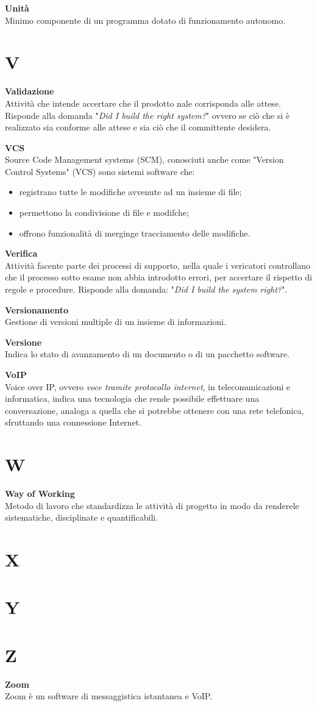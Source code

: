 \documentclass[a4paper, oneside, openany, dvipsnames, table, 12pt]{article}
\begin{document}
\textbf{Unità} \\
Minimo componente di un programma dotato di funzionamento autonomo.


\newpage
\section{V}
\textbf{Validazione} \\
Attività che intende accertare che il prodotto nale corrisponda alle attese. Risponde alla domanda "\textit{Did I build the right system?}" ovvero se ciò che si è realizzato sia conforme alle attese e sia ciò che il committente desidera.

\textbf{VCS} \\
Source Code Management systems (SCM), conosciuti anche come "Version Control Systems" (VCS) sono sistemi software che: \begin{itemize}
\item registrano tutte le modifiche avvenute ad un insieme di file;
\item permettono la condivisione di file e modifche;
\item offrono funzionalità di merging\glo e tracciamento delle modifiche.
\end{itemize}

\textbf{Verifica} \\
Attività facente parte dei processi di supporto, nella quale i vericatori controllano che il processo sotto esame non abbia introdotto errori, per accertare il rispetto di regole e procedure. Risponde alla domanda: "\textit{Did I build the system right?}".

\textbf{Versionamento} \\
Gestione di versioni multiple di un insieme di informazioni.

\textbf{Versione} \\
Indica lo stato di avanzamento di un documento o di un pacchetto software.

\textbf{VoIP} \\
Voice over IP, ovvero \textit{voce tramite protocollo internet}, in telecomunicazioni e informatica, indica una tecnologia che rende possibile effettuare una conversazione, analoga a quella che si potrebbe ottenere con una rete telefonica, sfruttando una connessione Internet.

\newpage
\section{W}
\textbf{Way of Working} \\
Metodo di lavoro che standardizza le attività di progetto in modo da renderele sistematiche, disciplinate e quantificabili.

\newpage
\section{X}

\newpage
\section{Y}

\newpage
\section{Z}
\textbf{Zoom} \\
Zoom è un software di messaggistica istantanea e VoIP\glo. 
\end{document}
